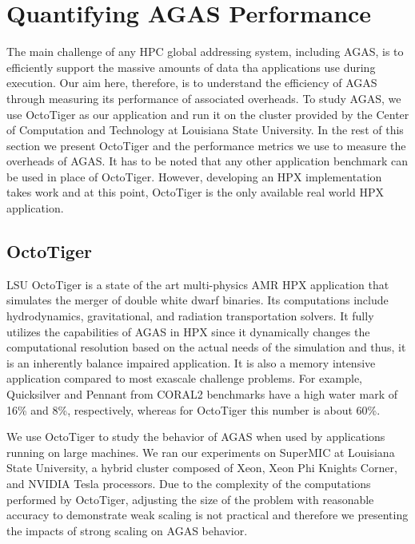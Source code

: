 \section{Quantifying AGAS Performance}
\label{performance}

The main challenge of any HPC global addressing system, including AGAS, is to
efficiently support the massive amounts of data tha applications use during
execution. Our aim here, therefore, is to understand the efficiency of AGAS
through measuring its performance of associated overheads.
To study AGAS, we use OctoTiger\cite{kadam2017numerical,octotiger_repo} as our
application and run it on the cluster provided by the Center of Computation and
Technology at Louisiana State University. In the rest of this section we
present OctoTiger and the performance metrics we use to measure the overheads
of AGAS. It has to be noted that any other application benchmark can be used in
place of OctoTiger. However, developing an HPX implementation takes work and at
this point, OctoTiger is the only available real world HPX application.

\subsection{OctoTiger}
LSU OctoTiger is a state of the art multi-physics AMR HPX application that
simulates the merger of double white dwarf binaries. Its computations include
hydrodynamics, gravitational, and radiation transportation solvers. It fully
utilizes the capabilities of AGAS in HPX since it dynamically changes the
computational resolution based on the actual needs of the simulation and thus, 
it is an inherently balance impaired application. It is also a memory intensive
application compared to most exascale challenge problems. For example,
Quicksilver and Pennant from CORAL2 benchmarks have a high water mark of 16\%
and 8\%, respectively, whereas for OctoTiger this number is about 60\%.

We use OctoTiger to study the behavior of AGAS when used by applications
running on large machines. We ran our experiments on SuperMIC at Louisiana
State University, a hybrid cluster composed of Xeon, Xeon Phi Knights Corner, 
and NVIDIA Tesla processors. Due to the complexity of the computations
performed by OctoTiger, adjusting the size of the problem with reasonable
accuracy to demonstrate weak scaling is not practical and therefore we
presenting the impacts of strong scaling on AGAS behavior.


